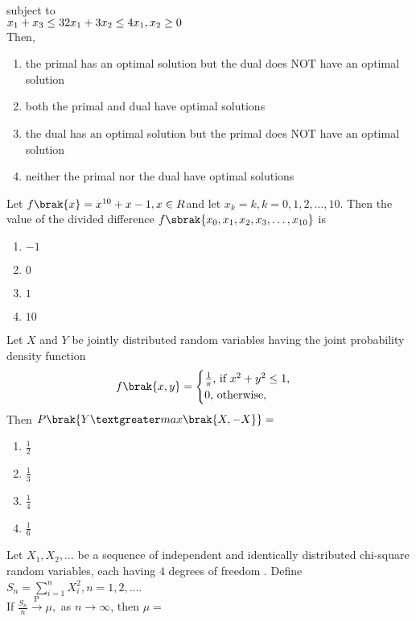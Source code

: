     subject to\\
    $x_1+x_3\leq 3\\
    2x_1+3x_2\leq 4\\
    x_1,x_2\geq0$\\
    Then,
    \begin{enumerate}
        \item the primal has an optimal solution but the dual does NOT have an optimal solution
        \item both the primal and dual have optimal solutions
        \item the dual has an optimal solution but the primal does NOT have an optimal solution
        \item neither the primal nor the dual have optimal solutions
    \end{enumerate}
    \item Let $f\brak{x}=x^{10}+x-1,x\in R$and let $x_k=k,k=0,1,2,\dots,10$. Then the value of the divided difference $f\sbrak{x_0,x_1,x_2,x_3,\dots,x_{10}}$ is
    \begin{enumerate}
        \item $-1$
        \item $0$
        \item $1$
        \item $10$
    \end{enumerate}
    \item Let $X$ and $Y$ be jointly distributed random variables having the joint probability density function 
    $$f\brak{x,y}=
    \begin{cases}
        \frac{1}{\pi} \text{,  if } x^2+y^2\leq1,\\
        0 \text{, otherwise},
    \end{cases}
    $$
    Then $P\brak{Y\textgreater max \brak{X,-X}}=$
    \begin{enumerate}
        \item $\frac{1}{2}$
        \item $\frac{1}{3}$
        \item $\frac{1}{4}$
        \item $\frac{1}{6}$
    \end{enumerate}
    \item Let $X_1,X_2,\dots$ be a sequence of independent and identically distributed chi-square random variables, each having $4$ degrees of freedom . Define $S_n=\sum_{i=1}^{n}X_i^2, n=1,2,\dots$.\\
    If $\frac{S_n}{n}\overset{\text{P}}{\longrightarrow}\mu,$ as $n\to \infty$, then $\mu=$
